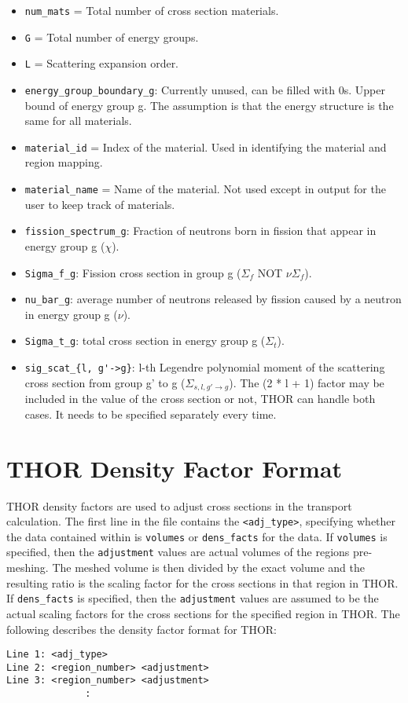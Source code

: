 \begin{itemize}
\item \verb"num_mats" = Total number of cross section materials.
\item \verb"G" = Total number of energy groups.
\item \verb"L" = Scattering expansion order.
\item \verb"energy_group_boundary_g": Currently unused, can be filled with 0s. Upper bound of energy group g. The assumption is that the energy structure is the same for all materials.
\item \verb"material_id" = Index of the material. Used in identifying the material and region mapping.
\item \verb"material_name" = Name of the material. Not used except in output for the user to keep track of materials.
\item \verb"fission_spectrum_g": Fraction of neutrons born in fission that appear in energy group g ($\chi$).
\item \verb"Sigma_f_g": Fission cross section in group g ($\Sigma_f$ NOT $\nu\Sigma_f$).
\item \verb"nu_bar_g": average number of neutrons released by fission caused by a neutron in energy group g ($\nu$).
\item \verb"Sigma_t_g": total cross section in energy group g ($\Sigma_t$).
\item \verb"sig_scat_{l, g'->g}": l-th Legendre polynomial moment of the scattering cross section from group g’ to g ($\Sigma_{s,l,g'\rightarrow g}$). The (2 * l + 1) factor may be included in the value of the cross section or not, \ac{THOR} can handle both cases. It needs to be specified separately every time.
\end{itemize}

\section{THOR Density Factor Format}\label{ch:inp:sec:densfact}

\ac{THOR} density factors are used to adjust cross sections in the transport calculation.
The first line in the file contains the \verb"<adj_type>", specifying whether the data contained within is \verb"volumes" or \verb"dens_facts" for the data.
If \verb"volumes" is specified, then the \verb"adjustment" values are actual volumes of the regions pre-meshing.
The meshed volume is then divided by the exact volume and the resulting ratio is the scaling factor for the cross sections in that region in \ac{THOR}.
If \verb"dens_facts" is specified, then the \verb"adjustment" values are assumed to be the actual scaling factors for the cross sections for the specified region in \ac{THOR}.
The following describes the density factor format for \ac{THOR}:
\begin{verbatim}
Line 1: <adj_type>
Line 2: <region_number> <adjustment>
Line 3: <region_number> <adjustment>
              :
\end{verbatim}

